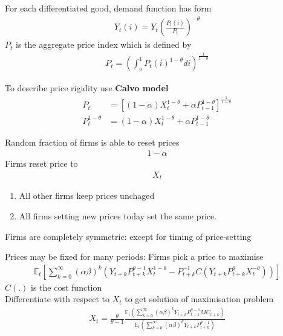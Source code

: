 \documentclass{beamer}
\begin{document}
\begin{frame}
 For each differentiated good, demand function has form 
\begin{align}
  Y_t(i)=Y_t \left( \frac{P_t(i)}{P_t}\right)^{-\theta}
\end{align}
\medskip
$P_t$ is the aggregate price index which is defined by
\begin{align}
  P_t=\left( \int_o^1 P_t(i)^{1-\theta}di \right)^{\frac{1}{1-\theta}}
\end{align}  
\end{frame}

\begin{frame}
 To describe price rigidity use \textbf{Calvo model}\\ 
\begin{align}
  P_t &= \left[(1-\alpha)X_t^{1-\theta} + \alpha P_{t-1}^{1-\theta} \right] ^{\frac{1}{1-\theta}}\\
  P_t^{1-\theta} &= (1-\alpha)X_t^{1-\theta} + \alpha P_{t-1}^{1-\theta}
\end{align}
\end{frame}

\begin{frame}
Random fraction of firms is able to reset prices
\begin{align}
   1-\alpha 
\end{align}
Firms reset price to 
\begin{align}
   X_t 
\end{align}
\begin{enumerate}
  \item All other firms keep prices unchaged
  \item All firms setting new prices today set the same price.
\end{enumerate}
\medskip
 Firms are completely symmetric: except for timing of price-setting
\end{frame}

\begin{frame}
 Prices may be fixed for many periods: Firms pick a price to maximise
\begin{align}
  \mathbb{E}_t \left[ \sum_{k=0}^{\infty} (\alpha \beta)^k (Y_{t+k}P_{t+k}^{\theta-1}X_t^{1-\theta} -
  P_{t+k}^{-1}C (Y_{t+k}P_{t+k}^{\theta}X_t^{-\theta}) ) \right]
\end{align}
$C(.)$ is the cost function\\
Differentiate with respect to $X_t$ to get solution of maximisation problem
\begin{align}
  X_t = \frac{\theta}{\theta-1} \frac{\mathbb{E}_t \left(\sum_{k=0}^{\infty}(\alpha \beta)^k Y_{t+k}P_{t+k}^{\theta-1}MC_{t+k} \right)}
  {\mathbb{E}_t \left(\sum_{k=0}^{\infty}(\alpha \beta)^k Y_{t+k}P_{t+k}^{\theta-1} \right) }
\end{align}  
\end{frame}
\end{document}
